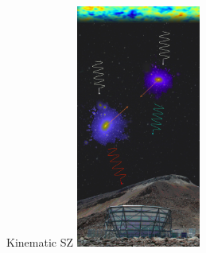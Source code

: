 \documentclass[table]{beamer}
\begin{document}
\begin{frame}{Kinematic SZ}
	\includegraphics[height=8cm]{sz_act_boss_sudeep.jpeg}
\end{frame}







\end{document}

